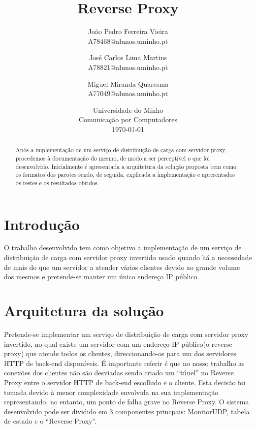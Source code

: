 \documentclass{article}
\begin{document}
\title{\textbf{Reverse Proxy}}
\author{João Pedro Ferreira Vieira\\
		A78468@alunos.uminho.pt \and
		José Carlos Lima Martins\\
        A78821@alunos.uminho.pt \and
        Miguel Miranda Quaresma\\
        A77049@alunos.uminho.pt}
\date{Universidade do Minho\\
	  Comunicação por Computadores\\[2ex]%
      \today}
\maketitle

\begin{abstract}
Após a implementação de um serviço de distribuição de carga com servidor proxy, procedemos à documentação do mesmo, de modo a ser perceptível o que foi desenvolvido. Inicialmente é apresentada a arquitetura da solução proposta bem como os formatos dos pacotes sendo, de seguida, explicada a implementação e apresentados os testes e os resultados obtidos.
\end{abstract}

\section{Introdução}
O trabalho desenvolvido tem como objetivo a implementação de um serviço de distribuição de carga com servidor proxy invertido usado quando há a necessidade de mais do que um servidor a atender vários clientes devido ao grande volume dos mesmos e pretende-se manter um único endereço IP público.

\section{Arquitetura da solução}
Pretende-se implementar um serviço de distribuição de carga com servidor proxy invertido, no qual existe um servidor com um endereço IP público(o reverse proxy) que atende todos os clientes, direccionando-os para um dos servidores HTTP de back-end disponíveis. 
É importante referir é que no nosso trabalho as conexões dos clientes não são desviadas sendo criado um ``túnel'' no Reverse Proxy entre o servidor HTTP de back-end escolhido e o cliente. Esta decisão foi tomada devido à menor complexidade envolvida na sua implementação representando, no entanto, um ponto de falha grave no Reverse Proxy.
O sistema desenvolvido pode ser dividido em 3 componentes princpais: MonitorUDP, tabela de estado e o ``Reverse Proxy''. 
\end{document}
